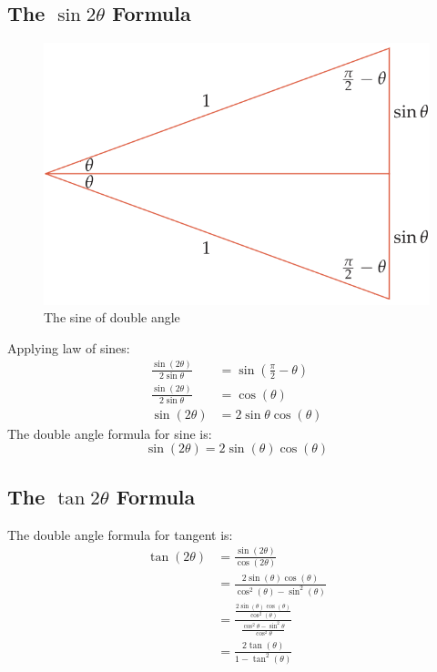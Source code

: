 \subsection{The $\sin 2\theta$ Formula}
\begin{figure}
    \centering
    \includegraphics[scale=0.3]{pics/36.png}
    \caption{The sine of double angle}
\end{figure}
Applying law of sines:
\begin{align}
    \frac{\sin(2\theta)}{2\sin \theta} &= \sin(\frac{\pi}{2} - \theta) \\
    \frac{\sin(2\theta)}{2\sin \theta} &= \cos(\theta) \\
    \sin(2\theta) &= 2\sin \theta \cos(\theta)
\end{align}
The double angle formula for sine is:
\[ \sin(2\theta) = 2\sin(\theta)\cos(\theta) \]

\subsection{The $\tan 2\theta$ Formula}
The double angle formula for tangent is:
\begin{align}
    \tan(2\theta) &= \frac{\sin(2\theta)}{\cos(2\theta)} \\
    &= \frac{2\sin(\theta)\cos(\theta)}{\cos^2(\theta) - \sin^2(\theta)} \\
    &=\frac{\frac{2\sin(\theta)\cos(\theta)}{\cos^{2}(\theta)}}{\frac{\cos^{2}\theta - \sin^2\theta}{\cos^2 \theta}} \\
    &= \frac{2\tan(\theta)}{1 - \tan^2(\theta)}
\end{align}

